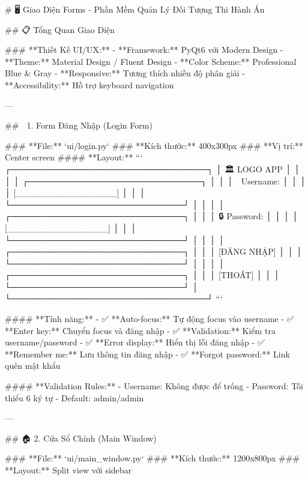 # 🖥️ Giao Diện Forms - Phần Mềm Quản Lý Đối Tượng Thi Hành Án

## 📋 Tổng Quan Giao Diện

### **Thiết Kế UI/UX:**
- **Framework:** PyQt6 với Modern Design
- **Theme:** Material Design / Fluent Design
- **Color Scheme:** Professional Blue & Gray
- **Responsive:** Tương thích nhiều độ phân giải
- **Accessibility:** Hỗ trợ keyboard navigation

---

## 🔐 1. Form Đăng Nhập (Login Form)

### **File:** `ui/login.py`
### **Kích thước:** 400x300px
### **Vị trí:** Center screen
#### **Layout:**
```
┌─────────────────────────────────┐
│        🏛️ LOGO APP             │
│                                 │
│  ┌─────────────────────────────┐ │
│  │ 👤 Username:               │ │
│  │    [________________]       │ │
│  └─────────────────────────────┘ │
│                                 │
│  ┌─────────────────────────────┐ │
│  │ 🔒 Password:               │ │
│  │    [________________]       │ │
│  └─────────────────────────────┘ │
│                                 │
│  ┌─────────────────────────────┐ │
│  │        [ĐĂNG NHẬP]         │ │
│  └─────────────────────────────┘ │
│                                 │
│  ┌─────────────────────────────┐ │
│  │        [THOÁT]             │ │
│  └─────────────────────────────┘ │
└─────────────────────────────────┘
```

#### **Tính năng:**
- ✅ **Auto-focus:** Tự động focus vào username
- ✅ **Enter key:** Chuyển focus và đăng nhập
- ✅ **Validation:** Kiểm tra username/password
- ✅ **Error display:** Hiển thị lỗi đăng nhập
- ✅ **Remember me:** Lưu thông tin đăng nhập
- ✅ **Forgot password:** Link quên mật khẩu

#### **Validation Rules:**
- Username: Không được để trống
- Password: Tối thiểu 6 ký tự
- Default: admin/admin

---

## 🏠 2. Cửa Sổ Chính (Main Window)

### **File:** `ui/main_window.py`
### **Kích thước:** 1200x800px
### **Layout:** Split view với sidebar

